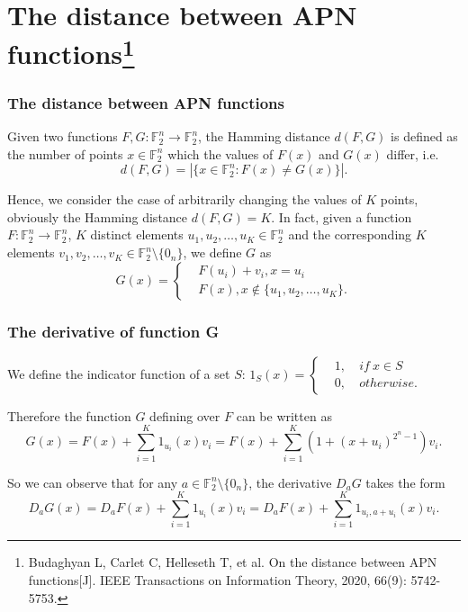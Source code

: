 \documentclass[
    aspectratio=169,                   %
]{beamer}
\newcommand{\F}{\mathbb{F}}
\begin{document}
\section{The distance between APN functions\footnote{Budaghyan L, Carlet C, Helleseth T, et al. On the distance between APN functions[J]. IEEE Transactions on Information Theory, 2020, 66(9): 5742-5753.}}
    \begin{frame}
        \frametitle{The distance between APN functions}
    
        Given two functions $F,G:\F_2^n \rightarrow \F_2^n$, the Hamming distance $d(F, G)$ is defined as the number of points $ x \in \F_2^n $  which the
        values of $F(x)$ and $G(x)$ differ, i.e. 
        \[d(F, G) = |\{x \in\F_2^n : F(x) \neq G(x)\}|.\]
    
        Hence, we consider the case of arbitrarily changing the values of $ K $ points, obviously the Hamming distance $ d(F,G)=K $. 
        In fact, given a function $F : \F_2^n \rightarrow \F_2^n$, 
        $K$ distinct elements $u_1,u_2,\dots,u_K \in \F_2^n$ and the corresponding $K$ elements $v_1,v_2,\dots,v_K \in \F_2^{n}\setminus\{0_n\}$, we define $G$ as
        \[G(x)=\left\{\begin{aligned}
            &F(u_i)+v_i, x=u_i\\
            &F(x), x\notin\{u_1,u_2,\dots,u_K\}.
        \end{aligned}\right.\]
    \end{frame}

    \begin{frame}
        \frametitle{The derivative of function G}
    
        We define the indicator function of a set $ S $: $ 1_S(x)=\left\{\begin{aligned}
            &1,&~if~x\in S\\
            &0,&~otherwise.
        \end{aligned}\right. $

        Therefore the function $ G $ defining over $ F $ can be written as 
        \[G(x)=F(x)+\sum_{i=1}^{K}1_{u_i}(x)v_i=F(x)+\sum_{i=1}^{K}(1+(x+u_i)^{2^n-1})v_i.\]

        So we can observe that for any $ a\in\F_2^n\setminus\{0_n\} $, the derivative $ D_aG $ takes the form
        \[D_aG(x)=D_aF(x)+\sum_{i=1}^{K}1_{u_i}(x)v_i=D_aF(x)+\sum_{i=1}^{K}1_{u_i,a+u_i}(x)v_i.\] 
    \end{frame}
    
\end{document}
